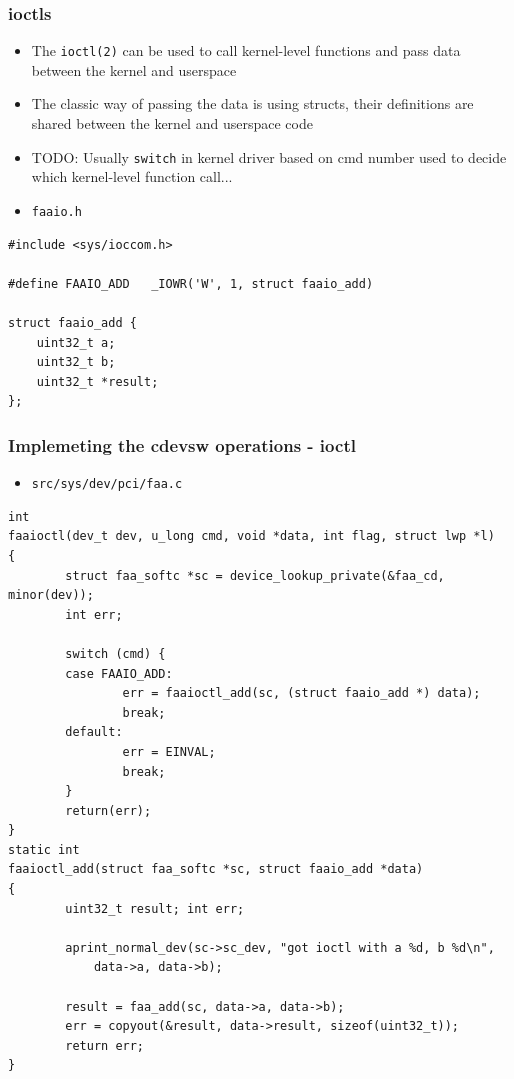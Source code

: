 \documentclass[dvipsnames,table]{beamer}
\begin{document}
\begin{frame}[fragile]
\frametitle{ioctls}
\begin{itemize}
	\item The {\tt ioctl(2)} can be used to call kernel-level functions and pass data between the kernel and userspace
	\item The classic way of passing the data is using structs, their definitions are shared between the kernel and userspace code
	\item TODO: Usually {\tt switch} in kernel driver based on cmd number used to decide which kernel-level function call...
	\item {\tt faaio.h}
\end{itemize}
\begin{lstlisting}
#include <sys/ioccom.h>

#define FAAIO_ADD	_IOWR('W', 1, struct faaio_add)

struct faaio_add {
    uint32_t a;
    uint32_t b;
    uint32_t *result;
};
\end{lstlisting}
\end{frame}



\begin{frame}[fragile]
\frametitle{Implemeting the cdevsw operations - ioctl}
\begin{itemize}
	\item {\tt src/sys/dev/pci/faa.c}
\end{itemize}
\begin{lstlisting}
int
faaioctl(dev_t dev, u_long cmd, void *data, int flag, struct lwp *l)
{
        struct faa_softc *sc = device_lookup_private(&faa_cd, minor(dev));
        int err;

        switch (cmd) {
        case FAAIO_ADD:
                err = faaioctl_add(sc, (struct faaio_add *) data);
                break;
        default:
                err = EINVAL;
                break;
        }
        return(err);
}
static int
faaioctl_add(struct faa_softc *sc, struct faaio_add *data)
{
        uint32_t result; int err;

        aprint_normal_dev(sc->sc_dev, "got ioctl with a %d, b %d\n",
            data->a, data->b);

        result = faa_add(sc, data->a, data->b);
        err = copyout(&result, data->result, sizeof(uint32_t));
        return err;
}
\end{lstlisting}
\end{frame}
\end{document}
